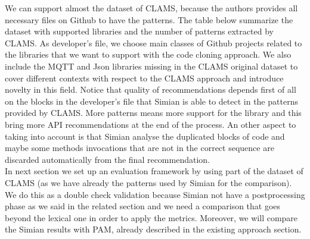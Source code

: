 We can support almost the dataset of CLAMS, because the authors provides all necessary files on Github to have the patterns. The table below summarize the dataset with supported libraries and the number of patterns extracted by CLAMS. As developer's file, we choose main classes of Github projects related to the libraries that we want to support with the code cloning approach. We also include the MQTT and Json libraries missing in the CLAMS original dataset to cover different contexts with respect to the CLAMS approach and introduce novelty in this field. Notice that quality of recommendations depends first of all on the blocks in the developer's file that Simian is able to detect in the patterns provided by CLAMS. More patterns means more support for the library and this bring more API recommendations at the end of the process. An other aspect to taking into account is that Simian analyse the duplicated blocks of code and maybe some methods invocations that are not in the correct sequence are discarded automatically from the final recommendation. \\
In next section we set up an evaluation framework  by using part of the dataset of CLAMS (as we have already the patterns used by Simian for the comparison). We do this as a double check validation because Simian not have a postprocessing phase as we said in the related section and we need a comparison that goes beyond the lexical one in order to apply the metrics. Moreover, we will compare the Simian results with PAM, already described in the existing approach section.




